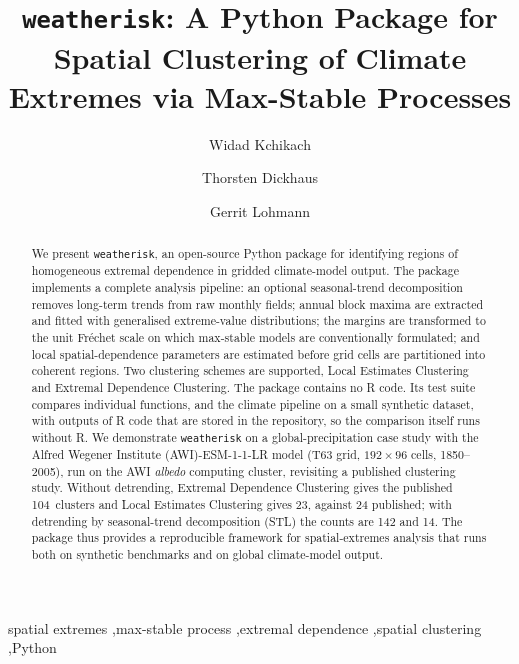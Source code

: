 \documentclass[preprint,12pt,a4paper]{elsarticle}
\newcommand{\revn}[1]{{#1}}
\newcommand{\revt}[1]{{#1}}
\begin{document}
\begin{frontmatter}

\title{\texttt{weatherisk}: A Python Package for Spatial Clustering
  of Climate Extremes via Max-Stable Processes}

\author[awi,uni]{Widad Kchikach}

\author[uni]{Thorsten Dickhaus}
\author[awi,uni]{Gerrit Lohmann}

\address[awi]{Alfred Wegener Institute Helmholtz Centre for Polar
  and Marine Research, Bremerhaven, Germany}
\address[uni]{University of Bremen, Bremen, Germany}

\begin{abstract}
We present \texttt{weatherisk}, an open-source Python package for
identifying regions of homogeneous extremal dependence in gridded
climate-model output. The package implements a
complete analysis pipeline: an optional \revt{seasonal-trend decomposition}
removes long-term trends from raw monthly fields; annual block maxima are
extracted and fitted with \revt{generalised extreme-value}
distributions; the margins are transformed to the unit Fr\'{e}chet
scale on which max-stable models are conventionally formulated;
and local spatial-dependence parameters are estimated before
grid cells are partitioned into coherent regions. Two clustering
schemes are supported, Local Estimates Clustering and Extremal
Dependence Clustering. The package contains no R code. Its test suite
compares individual functions, and the climate pipeline on a small
synthetic dataset, with outputs of R code that are stored in the
repository, so the comparison itself runs without R. We demonstrate
\texttt{weatherisk} on a global-precipitation case study with the
\revt{Alfred Wegener Institute (AWI)}-ESM-1-1-LR model \revn{(T63 grid, $192\times96$
cells, 1850--2005),} run on the AWI \emph{albedo} computing cluster, \revn{revisiting a published clustering study.
Without detrending, Extremal Dependence Clustering gives the published
104~clusters and Local Estimates Clustering gives 23, against 24
published; with detrending by seasonal-trend decomposition (STL) the
counts are 142 and 14. The package} thus provides a reproducible
framework for spatial-extremes analysis that runs both on synthetic
benchmarks and on global climate-model output.
\end{abstract}

\begin{keyword}
\revt{spatial extremes \sep max-stable process \sep extremal dependence \sep spatial clustering \sep Python}
\end{keyword}

\end{frontmatter}
\end{document}
